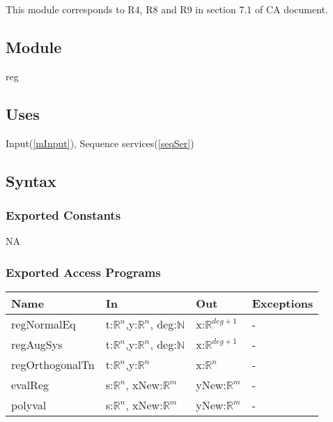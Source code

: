 \documentclass[12pt, titlepage]{article}
\begin{document}
This module corresponds to R4, R8 and 
R9 in section 7.1 of CA document.

\subsection{Module}

reg

\subsection{Uses}

Input(\ref{mInput}), Sequence services(\ref{seqSer})

\subsection{Syntax}

\subsubsection{Exported Constants}

NA

\subsubsection{Exported Access Programs}

\begin{center}
	\begin{tabular}{p{4cm} p{4cm} p{4cm} p{2cm}}
		\hline
		\textbf{Name} & \textbf{In} & \textbf{Out} & \textbf{Exceptions} \\
		\hline
		
		regNormalEq & t:$\mathbb{R}^n$,y:$\mathbb{R}^n$, deg:$\mathbb{N}$  & 
		x:$\mathbb{R}^{deg+1}$ & - \\
		
		regAugSys & t:$\mathbb{R}^n$,y:$\mathbb{R}^n$, deg:$\mathbb{N}$ & 
		x:$\mathbb{R}^{deg+1}$& - \\
		
		regOrthogonalTn & t:$\mathbb{R}^n$,y:$\mathbb{R}^n$ & x:$\mathbb{R}^{n}$
		& - \\
		evalReg & s:$\mathbb{R}^n$, xNew:$\mathbb{R}^m$ & yNew:$\mathbb{R}^m$ & 
		- \\

		polyval & s:$\mathbb{R}^n$, xNew:$\mathbb{R}^m$ & yNew:$\mathbb{R}^m$ & 
		- \\		
		\hline
	\end{tabular}
\end{center}
\end{document}

